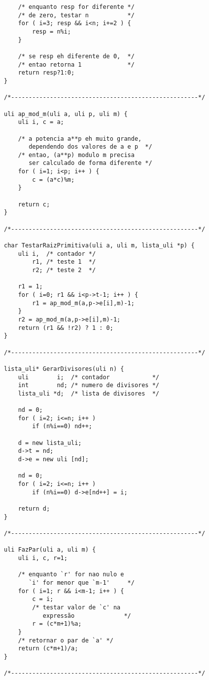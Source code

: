 \documentclass[a4paper,12pt,oneside,onecolumn]{uerj/uerj}
\begin{document}
\begin{verbatim}
    /* enquanto resp for diferente */
    /* de zero, testar n           */
    for ( i=3; resp && i<n; i+=2 ) {
        resp = n%i;
    }

    /* se resp eh diferente de 0,  */
    /* entao retorna 1             */
    return resp?1:0;
}

/*-----------------------------------------------------*/

uli ap_mod_m(uli a, uli p, uli m) {
    uli i, c = a;

    /* a potencia a**p eh muito grande, 
       dependendo dos valores de a e p  */
    /* entao, (a**p) modulo m precisa 
       ser calculado de forma diferente */
    for ( i=1; i<p; i++ ) {
        c = (a*c)%m;
    }

    return c;
}

/*-----------------------------------------------------*/

char TestarRaizPrimitiva(uli a, uli m, lista_uli *p) {
    uli i,  /* contador */
        r1, /* teste 1  */
        r2; /* teste 2  */

    r1 = 1;
    for ( i=0; r1 && i<p->t-1; i++ ) {
        r1 = ap_mod_m(a,p->e[i],m)-1;
    }
    r2 = ap_mod_m(a,p->e[i],m)-1;
    return (r1 && !r2) ? 1 : 0;
}

/*-----------------------------------------------------*/

lista_uli* GerarDivisores(uli n) {
    uli        i;  /* contador            */
    int        nd; /* numero de divisores */
    lista_uli *d;  /* lista de divisores  */

    nd = 0;
    for ( i=2; i<=n; i++ ) 
        if (n%i==0) nd++;

    d = new lista_uli;
    d->t = nd;
    d->e = new uli [nd];

    nd = 0;
    for ( i=2; i<=n; i++ )
        if (n%i==0) d->e[nd++] = i;

    return d;
}

/*-----------------------------------------------------*/

uli FazPar(uli a, uli m) {
    uli i, c, r=1;

    /* enquanto `r' for nao nulo e 
       `i' for menor que `m-1'     */
    for ( i=1; r && i<m-1; i++ ) {
        c = i;
        /* testar valor de `c' na 
           expressão              */
        r = (c*m+1)%a;
    }
    /* retornar o par de `a' */
    return (c*m+1)/a;
}

/*-----------------------------------------------------*/
\end{verbatim}
\end{document}
